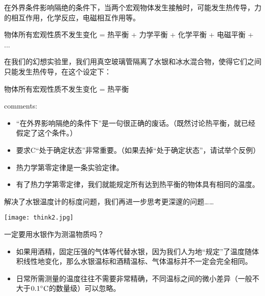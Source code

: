 \documentclass[CJK]{beamer}
\begin{document}
\begin{frame}
\bch
在外界条件影响隔绝的条件下，当两个宏观物体发生接触时，可能发生热传导，力的相互作用，化学反应，电磁相互作用等。

\skipline

物体所有宏观性质不发生变化 = 热平衡 + 力学平衡 + 化学平衡 + 电磁平衡 + ... 

\skiplines

在我们的幻想实验里，我们用真空玻璃管隔离了水银和冰水混合物，使得它们之间只能发生热传导，在这个设定下：

\skipline

物体所有宏观性质不发生变化 = 热平衡

\ech
\end{frame}

\begin{frame}
\bch
{\large {}}

\skiplines

comments:
\begin{itemize}
\item{“在外界影响隔绝的条件下”是一句很正确的废话。{\small（既然讨论热平衡，就已经假定了这个条件。）}}
\item{要求C“处于确定状态”非常重要。（如果去掉“处于确定状态”，请试举个反例）}
\item{热力学第零定律是一条实验定律。}
\item{有了热力学第零定律，我们就能规定所有达到热平衡的物体具有相同的温度。}
\end{itemize}
\ech
\end{frame}

\begin{frame}
\bch
解决了水银温度计的标度问题，我们再进一步思考更深邃的问题……
\begin{center}
\texttt{[image: think2.jpg]}
\end{center}
\ech
\end{frame}

\begin{frame}
\bch
一定要用水银作为测温物质吗？

\skiplines

\begin{itemize}
\item{如果用酒精，固定压强的气体等代替水银，因为我们人为地“规定”了温度随体积线性地变化，那么水银温标和酒精温标、气体温标并不一定会完全相同。}
\item{日常所需测量的温度往往不需要非常精确，不同温标之间的微小差异（一般不大于$0.1^\circ \mathrm{C}$的数量级）可以忽略。}
\end{itemize}

\ech
\end{frame}
\end{document}
